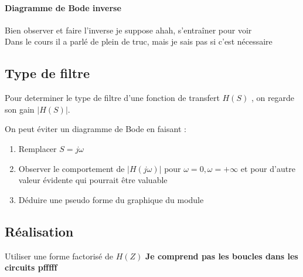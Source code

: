 \documentclass{article}
\theoremstyle{plain}%
\theoremstyle{definition}
\theoremstyle{remark}
\begin{document}
\paragraph*{Diagramme de Bode inverse}
Bien observer et faire l'inverse je suppose ahah, s'entraîner pour voir \\
Dans le cours il a parlé de plein de truc, mais je sais pas si c'est nécessaire

\subsection{Type de filtre}
Pour determiner le type de filtre d'une fonction de transfert $ H(S) $ , on regarde son gain $ \left| H(S) \right| $.

On peut éviter un diagramme de Bode en faisant :
\begin{enumerate}
    \item Remplacer $ S=j \omega  $ 
    \item Observer le comportement de $ \left| H(j \omega ) \right|  $ pour $ \omega = 0, \omega =+\infty  $  et pour d'autre valeur évidente qui pourrait être valuable
    \item Déduire une pseudo forme du graphique du module
\end{enumerate}

\subsection{Réalisation}
Utiliser une forme factorisé de $ H(Z) $ 
\textbf{Je comprend pas les boucles dans les circuits pfffff}
\end{document}
